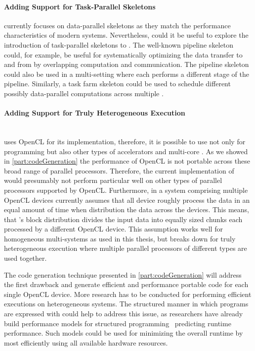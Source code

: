 \paragraph{Adding Support for Task-Parallel Skeletons}
\SkelCL currently focuses on data-parallel skeletons as they match the performance characteristics of modern \GPU systems.
Nevertheless, could it be useful to explore the introduction of task-parallel skeletons to \SkelCL.
The well-known pipeline skeleton could, for example, be useful for systematically optimizing the data transfer to and from \GPUs by overlapping computation and communication.
The pipeline skeleton could also be used in a multi-\GPU setting where each \GPUs performs a different stage of the pipeline.
Similarly, a task farm skeleton could be used to schedule different possibly data-parallel computations across multiple \GPUs.

\paragraph{Adding Support for Truly Heterogeneous Execution}\hfill\\
\SkelCL uses OpenCL for its implementation, therefore, it is possible to use \SkelCL not only for programming \GPUs but also other types of accelerators and multi-core \CPUs.
As we showed in \autoref{part:codeGeneration} the performance of OpenCL is not portable across these broad range of parallel processors.
Therefore, the current implementation of \SkelCL would presumably not perform particular well on other types of parallel processors supported by OpenCL.
Furthermore, in a system comprising multiple OpenCL devices \SkelCL currently assumes that all device roughly process the data in an equal amount of time when distribution the data across the devices.
This means, that \SkelCL's block distribution divides the input data into equally sized chunks each processed by a different OpenCL device.
This assumption works well for homogeneous multi-\GPU systems as used in this thesis, but breaks down for truly heterogeneous execution where multiple parallel processors of different types are used together.

The code generation technique presented in \autoref{part:codeGeneration} will address the first drawback and generate efficient and performance portable code for each single OpenCL device.
More research has to be conducted for performing efficient executions on heterogeneous systems.
The structured manner in which programs are expressed with \SkelCL could help to address this issue, as researchers have already build performance models for structured programming~\cite{HayashiC02,BischofGK03,Alt2007,DarlingtonFHKSW93,StegmeierFrJAUn2015} predicting runtime performance.
Such models could be used for minimizing the overall runtime by most efficiently using all available hardware resources.


